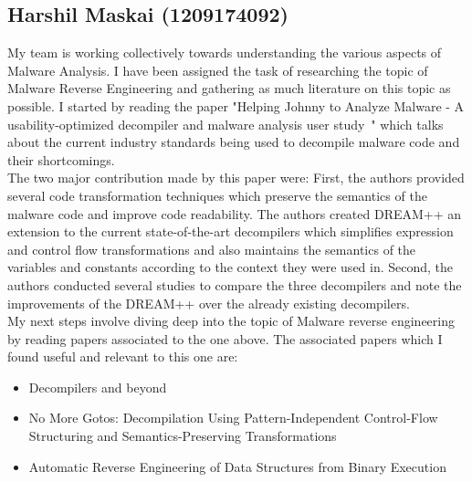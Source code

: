 \documentclass[16pt]{article}
\begin{document}
		\subsection{Harshil Maskai (1209174092)}
		My team is working collectively towards understanding the various aspects of Malware Analysis. I have been assigned the task of researching the topic of Malware Reverse Engineering and gathering as much literature on this topic as possible. I started by reading the paper "Helping Johnny to Analyze Malware - A usability-optimized decompiler and malware analysis user study~\cite{yakdan2016helping}" which talks about the current industry standards being used to decompile malware code and their shortcomings. \\
		The two major contribution made by this paper were:
		First, the authors provided several code transformation techniques which preserve the semantics of the malware code and improve code readability. The authors created DREAM++ an extension to the current state-of-the-art decompilers which simplifies expression and control flow transformations and also maintains the semantics of the variables and constants according to the context they were used in.
		Second, the authors conducted several studies to compare the three decompilers and note the improvements of the DREAM++ over the already existing decompilers.\\
		My next steps involve diving deep into the topic of Malware reverse engineering by reading papers associated to the one above. 
		The associated papers which I found useful and relevant to this one are:
		\begin{itemize}
			\item{Decompilers and beyond~\cite{guilfanov2008decompilers}}
			\item{No More Gotos: Decompilation Using Pattern-Independent Control-Flow Structuring and Semantics-Preserving Transformations~\cite{yakdan2015no}}
			\item{Automatic Reverse Engineering of Data Structures from Binary Execution~\cite{lin2010automatic}}
		\end{itemize}
		
\end{document}
